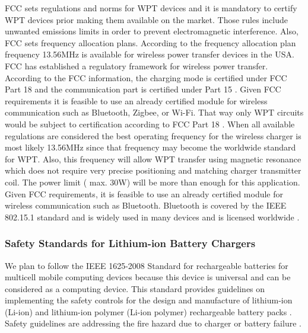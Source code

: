 \documentclass[12pt]{article}
\begin{document}
\indent
FCC sets  regulations and norms  for WPT devices and it is mandatory to certify WPT devices prior making them available on the market. Those rules include unwanted emissions limits in order to prevent electromagnetic interference. Also, FCC sets frequency allocation plans. According to the frequency allocation plan frequency 13.56MHz is available for wireless power transfer devices in the USA. \\

\indent
 FCC has established a regulatory framework for wireless power transfer. According to the FCC information, the charging mode is certified under FCC Part 18 \cite{fcc18} and the communication part is certified under Part 15 \cite{fcc15}\cite{fccsum}. Given FCC requirements it is feasible to use an already certified module for wireless communication such as Bluetooth, Zigbee, or Wi-Fi. That way only WPT circuits would be subject to certification according to FCC Part 18 \cite{fcc18}. When all available regulations are considered the best operating frequency for the wireless charger is most likely 13.56MHz since that frequency may become the worldwide standard for WPT. Also, this frequency will allow WPT transfer using magnetic resonance which does not require very precise positioning and matching charger transmitter coil. The power limit ( max. 30W) will be more than enough for this application. \\

\indent
Given FCC requirements, it is feasible to use an already certified module for wireless communication such as Bluetooth. Bluetooth is covered by the IEEE 802.15.1 standard and is widely used in many devices and is licensed worldwide \cite{ieee802}.

\subsubsection{Safety Standards for Lithium-ion Battery Chargers}
We plan to follow the IEEE 1625-2008 Standard \cite{ieee1625} for rechargeable batteries for multicell mobile computing devices because this device is universal and can be considered as a computing device. This standard provides guidelines on implementing the safety controls for the design and manufacture of lithium-ion (Li-ion) and lithium-ion polymer (Li-ion polymer) rechargeable battery packs \cite{ieee1625}. Safety guidelines are addressing the fire hazard due to charger or battery failure \cite{ieee1625}.
\end{document}
